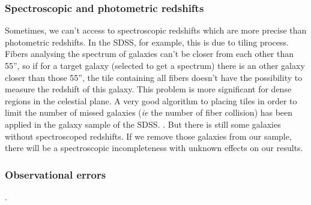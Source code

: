 \subsubsection{Spectroscopic and photometric redshifts}
%
Sometimes, we can't access to spectroscopic redshifts which are more precise
than photometric redshifts. In the SDSS, for example, this is due to tiling
process. Fibers analysing the spectrum of galaxies can't be closer from each
other than 55'', so if for a target galaxy (selected to get a spectrum)
there is an other galaxy closer than those 55'', the tile containing all fibers
doesn't have the possibility to measure the redshift of this galaxy. This
problem is more significant for dense regions in the celestial plane. A very
good algorithm to placing tiles in order to limit the number of missed galaxies
(\textit{ie} the number of fiber collision) has been applied in the galaxy
sample of the SDSS\@.
%
.
%
But there is still some galaxies without spectroscoped
redshifts. If we remove those galaxies from our sample, there will be a
spectroscopic incompleteness with unknown effects on our results.
%
%
\subsubsection{Observational errors}
%
%
.

